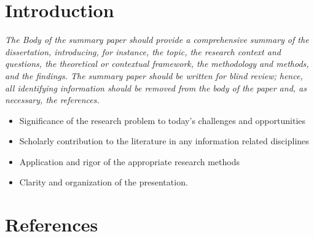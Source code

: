 \documentclass[
  12pt,twoside,BCOR=10mm
]{scrbook}
\begin{document}
\section*{Introduction}
{

\itshape
The Body of the summary paper should provide a comprehensive summary of the
dissertation, introducing, for instance, the topic, the research context and
questions, the theoretical or contextual framework, the methodology and
methods, and the findings. The summary paper should be written for blind
review; hence, all identifying information should be removed from the body of
the paper and, as necessary, the references.

\begin{itemize}
\item Significance of the research problem to today’s challenges and opportunities
\item Scholarly contribution to the literature in any information related disciplines
\item Application and rigor of the appropriate research methods
\item Clarity and organization of the presentation.
\end{itemize}

}



\cite{BallsunStanton2012}

\clearpage
\onehalfspacing
\section*{References}
\printbibliography[heading=none]
\end{document}
